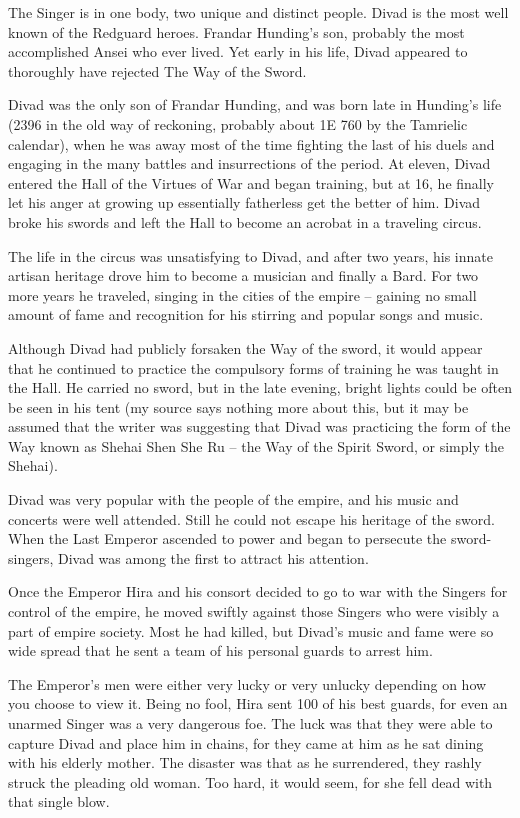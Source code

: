 
 The Singer is in one body, two unique and distinct people. Divad is the most well known of the Redguard heroes. Frandar Hunding's son, probably the most accomplished Ansei who ever lived. Yet early in his life, Divad appeared to thoroughly have rejected The Way of the Sword.

Divad was the only son of Frandar Hunding, and was born late in Hunding's life (2396 in the old way of reckoning, probably about 1E 760 by the Tamrielic calendar), when he was away most of the time fighting the last of his duels and engaging in the many battles and insurrections of the period. At eleven, Divad entered the Hall of the Virtues of War and began training, but at 16, he finally let his anger at growing up essentially fatherless get the better of him. Divad broke his swords and left the Hall to become an acrobat in a traveling circus.

The life in the circus was unsatisfying to Divad, and after two years, his innate artisan heritage drove him to become a musician and finally a Bard. For two more years he traveled, singing in the cities of the empire -- gaining no small amount of fame and recognition for his stirring and popular songs and music.

Although Divad had publicly forsaken the Way of the sword, it would appear that he continued to practice the compulsory forms of training he was taught in the Hall. He carried no sword, but in the late evening, bright lights could be often be seen in his tent (my source says nothing more about this, but it may be assumed that the writer was suggesting that Divad was practicing the form of the Way known as Shehai Shen She Ru -- the Way of the Spirit Sword, or simply the Shehai).

Divad was very popular with the people of the empire, and his music and concerts were well attended. Still he could not escape his heritage of the sword. When the Last Emperor ascended to power and began to persecute the sword-singers, Divad was among the first to attract his attention.

Once the Emperor Hira and his consort decided to go to war with the Singers for control of the empire, he moved swiftly against those Singers who were visibly a part of empire society. Most he had killed, but Divad's music and fame were so wide spread that he sent a team of his personal guards to arrest him.

The Emperor's men were either very lucky or very unlucky depending on how you choose to view it. Being no fool, Hira sent 100 of his best guards, for even an unarmed Singer was a very dangerous foe. The luck was that they were able to capture Divad and place him in chains, for they came at him as he sat dining with his elderly mother. The disaster was that as he surrendered, they rashly struck the pleading old woman. Too hard, it would seem, for she fell dead with that single blow.

